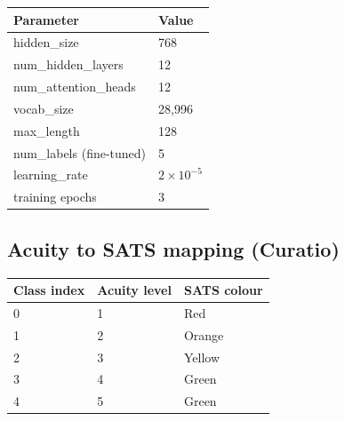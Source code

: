 \documentclass[11pt]{article}
\begin{document}
\begin{center}
\begin{tabular}{@{}ll@{}}
\toprule
\textbf{Parameter} & \textbf{Value} \\
\midrule
hidden\_size & 768 \\
num\_hidden\_layers & 12 \\
num\_attention\_heads & 12 \\
vocab\_size & 28{,}996 \\
max\_length & 128 \\
num\_labels (fine-tuned) & 5 \\
learning\_rate & $2 \times 10^{-5}$ \\
training epochs & 3 \\
\bottomrule
\end{tabular}
\end{center}

\subsection{Acuity to SATS mapping (Curatio)}

\begin{center}
\begin{tabular}{@{}lll@{}}
\toprule
\textbf{Class index} & \textbf{Acuity level} & \textbf{SATS colour} \\
\midrule
0 & 1 & Red \\
1 & 2 & Orange \\
2 & 3 & Yellow \\
3 & 4 & Green \\
4 & 5 & Green \\
\bottomrule
\end{tabular}
\end{center}
\end{document}
